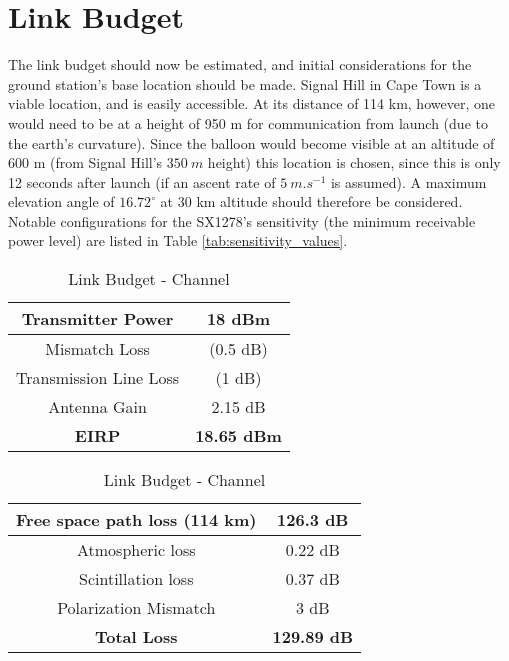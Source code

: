 \section{Link Budget}

The link budget should now be estimated, and initial considerations for the ground station's base location should be made. Signal Hill in Cape Town is a viable location, and is easily accessible. At its distance of 114 km, however, one would need to be at a height of 950 m for communication from launch (due to the earth's curvature). Since the balloon would become visible at an altitude of 600 m (from Signal Hill's $\SI{350}{m}$ height) this location is chosen, since this is only 12 seconds after launch (if an ascent rate of $\SI{5}{m.s^{-1}}$ is assumed). A maximum elevation angle of $16.72^\circ$ at 30 km altitude should therefore be considered. Notable configurations for the SX1278's sensitivity (the minimum receivable power level) are listed in Table \ref{tab:sensitivity_values}.

\begin{table}[!htb]
  \begin{minipage}{.49\textwidth}
      \centering
      \renewcommand{\arraystretch}{1.2}
      \begin{tabular}{ |c|c| }
      \hline
      Transmitter Power             & 18 dBm                    \\ \hline
      Mismatch Loss                 & (0.5 dB)                 \\ \hline
      Transmission Line Loss        & (1 dB)                  \\ \hline
      Antenna Gain                  & 2.15 dB                   \\ \hline
      \textbf{EIRP}                 & \textbf{18.65 dBm}        \\ \hline
      \end{tabular}
      \caption{Link Budget - Satellite}
      \label{tab:link_budget_satellite}
  \end{minipage}
  \begin{minipage}{.49\textwidth}
      \centering
      \renewcommand{\arraystretch}{1.2}
      \begin{tabular}{ |c|c| }
      \hline
      Free space path loss (114 km) & 126.3 dB                  \\ \hline
      Atmospheric loss              & 0.22 dB                   \\ \hline
      Scintillation loss            & 0.37 dB                   \\ \hline
      Polarization Mismatch         & 3 dB                      \\ \hline
      \textbf{Total Loss}           & \textbf{129.89 dB}         \\ \hline
      \end{tabular}
      \caption{Link Budget - Channel}
      \label{tab:link_budget_channel}
  \end{minipage}
\end{table}

